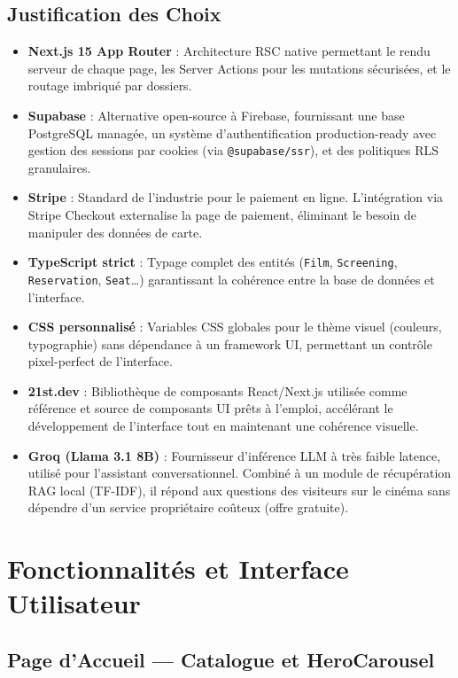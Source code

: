 \documentclass[12pt,a4paper,openany]{report}
\begin{document}
\section{Justification des Choix}

\begin{itemize}
  \item \textbf{Next.js 15 App Router} : Architecture RSC native permettant le rendu serveur de chaque page, les Server Actions pour les mutations sécurisées, et le routage imbriqué par dossiers.
  \item \textbf{Supabase} : Alternative open-source à Firebase, fournissant une base PostgreSQL managée, un système d'authentification production-ready avec gestion des sessions par cookies (via \texttt{@supabase/ssr}), et des politiques RLS granulaires.
  \item \textbf{Stripe} : Standard de l'industrie pour le paiement en ligne. L'intégration via Stripe Checkout externalise la page de paiement, éliminant le besoin de manipuler des données de carte.
  \item \textbf{TypeScript strict} : Typage complet des entités (\texttt{Film}, \texttt{Screening}, \texttt{Reservation}, \texttt{Seat}…) garantissant la cohérence entre la base de données et l'interface.
  \item \textbf{CSS personnalisé} : Variables CSS globales pour le thème visuel (couleurs, typographie) sans dépendance à un framework UI, permettant un contrôle pixel-perfect de l'interface.
  \item \textbf{21st.dev} : Bibliothèque de composants React/Next.js utilisée comme référence et source de composants UI prêts à l'emploi, accélérant le développement de l'interface tout en maintenant une cohérence visuelle.
  \item \textbf{Groq (Llama 3.1 8B)} : Fournisseur d'inférence LLM à très faible latence, utilisé pour l'assistant conversationnel. Combiné à un module de récupération RAG local (TF-IDF), il répond aux questions des visiteurs sur le cinéma sans dépendre d'un service propriétaire coûteux (offre gratuite).
\end{itemize}

\chapter{Fonctionnalités et Interface Utilisateur}

\section{Page d'Accueil — Catalogue et HeroCarousel}
\end{document}
